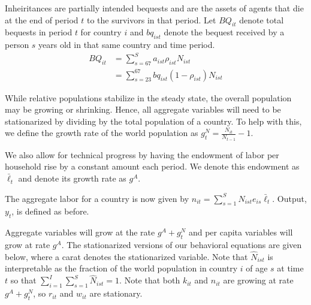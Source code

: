 \documentclass[letterpaper,12pt]{article}
\theoremstyle{definition}
\numberwithin{equation}{section}
\begin{document}
\begin{spacing}{1.5}
	Inheiritances are partially intended bequests and are the assets of agents that die at the end of period $t$ to the survivors in that period.  Let $BQ_{it}$ denote total bequests in period $t$ for country $i$ and $bq_{ist}$ denote the bequest received by a person $s$ years old in that same country and time period.
	\begin{align}
		BQ_{it} & = \sum_{s=67}^S a_{ist} \rho_{ist} N_{ist} \\
		& = \sum_{s=23}^{67} bq_{ist} (1-\rho_{ist}) N_{ist}
	\end{align}

	While relative populations stabilize in the steady state, the overall population may be growing or shrinking.  Hence, all aggregate variables will need to be stationarized by dividing by the total population of a country.  To help with this, we define the growth rate of the world population as $g^N_t = \tfrac{N_{it}}{N_{t-1}}-1$.

	We also allow for technical progress by having the endowment of labor per household rise by a constant amount each period.  We denote this endowment as $\bar \ell_t$ and denote its growth rate as $g^A$.

	The aggregate labor for a country is now given by $n_{it} = \sum_{s=1}^S N_{ist} e_{is} \bar \ell_t$.  Output, $y_t$, is defined as before. 

	Aggregate variables will grow at the rate $g^A+g^N_t$ and per capita variables will grow at rate $g^A$.  The stationarized versions of our behavioral equations are given below, where a carat denotes the stationarized variable.  Note that $\hat N_{ist}$ is interpretable as the fraction of the world population in country $i$ of age $s$ at time $t$ so that $\sum_{i=1}^I \sum_{s=1}^S \hat N_{ist} = 1$.  Note that both $k_{it}$ and $n_{it}$ are growing at rate $g^A+g^N_t$, so $r_{it}$ and $w_{it}$ are stationary.


\end{spacing}
\end{document}
